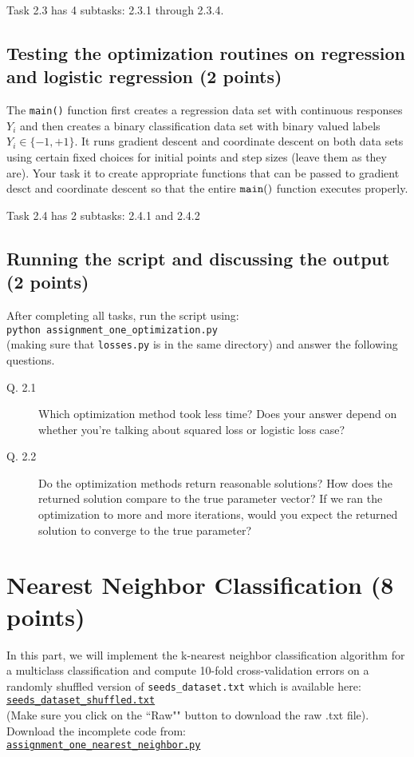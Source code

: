 \documentclass{article}
\begin{document}
Task 2.3 has 4 subtasks: 2.3.1 through 2.3.4.

\subsection{Testing the optimization routines on regression and logistic regression (2 points)}

The {\tt main()} function first creates a regression data set with continuous responses $Y_i$ and then creates a binary classification data set with
binary valued labels $Y_i \in \{-1,+1\}$. It runs gradient descent and coordinate descent on both data sets using certain fixed choices for initial
points and step sizes (leave them as they are). Your task it to create appropriate functions that can be passed to gradient desct and coordinate
descent so that the entire ${\tt main()}$ function executes properly.

Task 2.4 has 2 subtasks: 2.4.1 and 2.4.2

\subsection{Running the script and discussing the output (2 points)}

After completing all tasks, run the script using:\\
{\tt python assignment\_one\_optimization.py} \\
(making sure that {\tt losses.py} is in the same directory) and answer the following questions.

\begin{description}
\item[Q. 2.1]
Which optimization method took less time? Does your answer depend on whether you're talking about squared loss or logistic loss case?
\item[Q. 2.2]
Do the optimization methods return reasonable solutions? How does the returned solution compare to the true parameter vector?
If we ran the optimization to more and more iterations, would you expect the returned solution to converge to the true parameter?
\end{description}


\section{Nearest Neighbor Classification (8 points)}

In this part, we will implement the k-nearest neighbor classification algorithm for a multiclass classification and compute 10-fold cross-validation
errors on a randomly shuffled version of {\tt seeds\_dataset.txt} which is available here:\\
\href{https://github.com/ambujtewari/stats607a-fall2014/blob/master/homeworks/datasets/seeds_dataset_shuffled.txt}{\tt seeds\_dataset\_shuffled.txt} \\
(Make sure you click on the ``Raw"" button to download the raw .txt file).
Download the incomplete code from:\\
\href{https://github.com/ambujtewari/stats607a-fall2014/blob/master/homeworks/assignment_one_nearest_neighbor.py}{\tt assignment\_one\_nearest\_neighbor.py}
\end{document}
